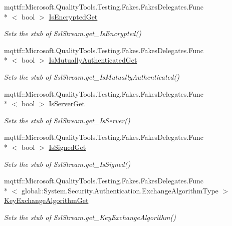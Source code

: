 \begin{DoxyCompactItemize}
mqttf\-::\-Microsoft.\-Quality\-Tools.\-Testing.\-Fakes.\-Fakes\-Delegates.\-Func\\*
$<$ bool $>$ \hyperlink{class_system_1_1_net_1_1_security_1_1_fakes_1_1_stub_ssl_stream_aba518d8908ca9dcb29b878d19265b96f}{Is\-Encrypted\-Get}
\begin{DoxyCompactList}\small\item\em Sets the stub of Ssl\-Stream.\-get\-\_\-\-Is\-Encrypted()\end{DoxyCompactList}\item 
mqttf\-::\-Microsoft.\-Quality\-Tools.\-Testing.\-Fakes.\-Fakes\-Delegates.\-Func\\*
$<$ bool $>$ \hyperlink{class_system_1_1_net_1_1_security_1_1_fakes_1_1_stub_ssl_stream_ade144202e141734b292234c6b98d2044}{Is\-Mutually\-Authenticated\-Get}
\begin{DoxyCompactList}\small\item\em Sets the stub of Ssl\-Stream.\-get\-\_\-\-Is\-Mutually\-Authenticated()\end{DoxyCompactList}\item 
mqttf\-::\-Microsoft.\-Quality\-Tools.\-Testing.\-Fakes.\-Fakes\-Delegates.\-Func\\*
$<$ bool $>$ \hyperlink{class_system_1_1_net_1_1_security_1_1_fakes_1_1_stub_ssl_stream_ac1b6c42f284dfd4afbf4acd0f0a6370b}{Is\-Server\-Get}
\begin{DoxyCompactList}\small\item\em Sets the stub of Ssl\-Stream.\-get\-\_\-\-Is\-Server()\end{DoxyCompactList}\item 
mqttf\-::\-Microsoft.\-Quality\-Tools.\-Testing.\-Fakes.\-Fakes\-Delegates.\-Func\\*
$<$ bool $>$ \hyperlink{class_system_1_1_net_1_1_security_1_1_fakes_1_1_stub_ssl_stream_ae2cb55037dfc0b9f36305f71923008a3}{Is\-Signed\-Get}
\begin{DoxyCompactList}\small\item\em Sets the stub of Ssl\-Stream.\-get\-\_\-\-Is\-Signed()\end{DoxyCompactList}\item 
mqttf\-::\-Microsoft.\-Quality\-Tools.\-Testing.\-Fakes.\-Fakes\-Delegates.\-Func\\*
$<$ global\-::\-System.\-Security.\-Authentication.\-Exchange\-Algorithm\-Type $>$ \hyperlink{class_system_1_1_net_1_1_security_1_1_fakes_1_1_stub_ssl_stream_a0729e4f63cd37e4c426b5bdc44c93950}{Key\-Exchange\-Algorithm\-Get}
\begin{DoxyCompactList}\small\item\em Sets the stub of Ssl\-Stream.\-get\-\_\-\-Key\-Exchange\-Algorithm()\end{DoxyCompactList}\item 

\end{DoxyCompactItemize}
